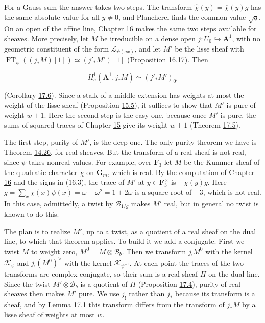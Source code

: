 \documentclass[11pt]{article}
\begin{document}
For a Gauss sum the answer takes two steps. The transform \(\hat\chi(y)=\overline\chi(y)g\) has the same absolute value for all \(y\ne0\), and Plancherel finds the common value \(\sqrt q\). On an open of the affine line, Chapter \hyperref[bp167]{16} makes the same two steps available for sheaves. More precisely, let \(M\) be irreducible on a dense open \(j:U_0\hookrightarrow\mathbf A^1\), with no geometric constituent of the form \(\mathcal L_{\psi(ax)}\), and let \(M'\) be the lisse sheaf with \(\operatorname{FT}_\psi((j_*M)[1])\simeq(j'_*M')[1]\) (Proposition \hyperref[bp218]{16.17}). Then

\[
H^1_c(\mathbf A^1,j_*M)\simeq(j'_*M')_{0'}
\]

(Corollary \hyperref[bp241]{17.6}). Since a stalk of a middle extension has weights at most the weight of the lisse sheaf (Proposition \hyperref[bp134]{15.5}), it suffices to show that \(M'\) is pure of weight \(w+1\). Here the second step is the easy one, because once \(M'\) is pure, the sums of squared traces of Chapter \hyperref[bp122]{15} give its weight \(w+1\) (Theorem \hyperref[bp238]{17.5}).

The first step, purity of \(M'\), is the deep one. The only purity theorem we have is Theorem \hyperref[bp120]{14.26}, for real sheaves. But the transform of a real sheaf is not real, since \(\psi\) takes nonreal values. For example, over \(\mathbf F_3\) let \(M\) be the Kummer sheaf of the quadratic character \(\chi\) on \(\mathbf G_m\), which is real. By the computation of Chapter \hyperref[bp167]{16} and the signs in (16.3), the trace of \(M'\) at \(y\in\mathbf F_3^\times\) is \(-\chi(y)g\). Here \(g=\sum_x\chi(x)\psi(x)=\omega-\omega^2=1+2\omega\) is a square root of \(-3\), which is not real. In this case, admittedly, a twist by \(\mathcal B_{1/g}\) makes \(M'\) real, but in general no twist is known to do this.

The plan is to realize \(M'\), up to a twist, as a quotient of a real sheaf on the dual line, to which that theorem applies. To build it we add a conjugate. First we twist \(M\) to weight zero, \(M^0=M\otimes\mathcal B_b\). Then we transform \(j_!M^0\) with the kernel \(\mathcal K_\psi\) and \(j_!(M^0)^\vee\) with the kernel \(\mathcal K_{\psi^{-1}}\). At each point the traces of the two transforms are complex conjugate, so their sum is a real sheaf \(H\) on the dual line. Since the twist \(M'\otimes\mathcal B_b\) is a quotient of \(H\) (Proposition \hyperref[bp234]{17.4}), purity of real sheaves then makes \(M'\) pure. We use \(j_!\) rather than \(j_*\) because its transform is a sheaf, and by Lemma \hyperref[bp227]{17.1} this transform differs from the transform of \(j_*M\) by a lisse sheaf of weights at most \(w\).
\end{document}
